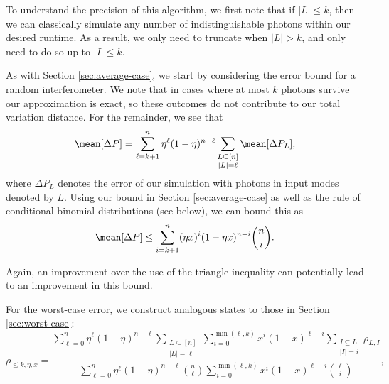 To understand the precision of this algorithm, we first note that if $|L|\leq k$, then we can classically simulate any number of indistinguishable photons within our desired runtime. 
As a result, we only need to truncate when $|L|>k$, and only need to do so up to $|I|\leq k$. 

As with Section \ref{sec:average-case}, we start by considering the error bound for a random interferometer. We note that in cases where at most $k$ photons survive our approximation is exact, so these outcomes do not contribute to our total variation distance. 
For the remainder, we see that
\begin{equation}
\mean[\Delta P] = \sum_{\ell=k+1}^n\eta^\ell(1-\eta)^{n-\ell}\sum_{\substack{L\subseteq[n]\\|L|=\ell}}\mean[\Delta P_L],
\end{equation}
where $\Delta P_L$ denotes the error of our simulation with photons in input modes denoted by $L$. 
Using our bound in Section \ref{sec:average-case} as well as the rule of conditional binomial distributions (see below), we can bound this as
\begin{equation}
\mean[\Delta P] \leq \sum_{i=k+1}^n(\eta x)^i(1-\eta x)^{n-i}\binom{n}{i}.
\end{equation}

Again, an improvement over the use of the triangle inequality can potentially lead to an improvement in this bound.


For the worst-case error, we construct analogous states to those in Section \ref{sec:worst-case}:
\begin{equation}
\rho_{\leq k,\eta,x} = \frac{\sum_{\ell=0}^n\eta^\ell(1-\eta)^{n-\ell}\sum_{\substack{L\subseteq[n]\\|L|=\ell}}\sum_{i=0}^{\min(\ell,k)} x^i(1-x)^{\ell-i}\sum_{\substack{I\subseteq L\\|I|=i}}\rho_{L,I}}{\sum_{\ell=0}^n\eta^\ell(1-\eta)^{n-\ell}\binom{n}{\ell}\sum_{i=0}^{\min(\ell,k)} x^i(1-x)^{\ell-i}\binom{\ell}{i}},
\end{equation}

